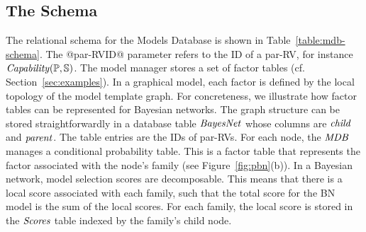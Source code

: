 \documentclass{IEEEtran}
\begin{document}
\subsection{The \MDB Schema}

The relational schema for the Models Database is shown in Table~\ref{table:mdb-schema}. The @par-RVID@ parameter refers to the ID  of a par-RV, for instance $\it{Capability}(\P,\S)$.
The model manager stores a set of factor tables (cf. Section~\ref{sec:examples}). In a graphical model, each factor is defined by the local topology of the model template graph. For concreteness, we illustrate how factor tables can be represented  for Bayesian networks. The graph structure can be stored straightforwardly in a database table $\it{BayesNet}$ whose columns are $\it{child}$ and $\it{parent}$. The table entries are the IDs of par-RVs. 
For each node, the $\MDB$ manages a conditional probability table. This is a factor table that represents the factor associated with the node's family (see Figure~\ref{fig:pbn}(b)).
%
%
In a Bayesian network, model selection scores are decomposable. This means that there is a local score associated with each family, such that the total score for the BN model is the sum of the local scores. For each family, the local score is stored in the $\it{Scores}$ table indexed by the family's child node.
\end{document}
